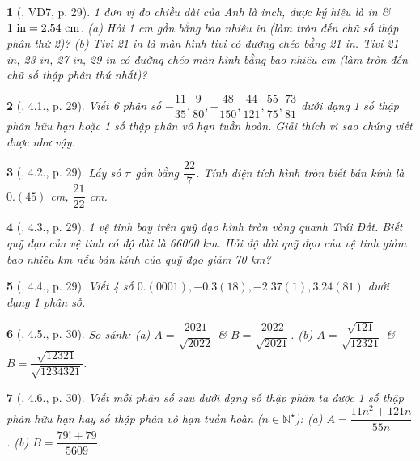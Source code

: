 \documentclass{article}
\newtheorem{baitoan}{}
\begin{document}
\begin{baitoan}[\cite{Binh_boi_duong_Toan_7_tap_1}, VD7, p. 29]
	1 đơn vị đo chiều dài của Anh là inch, được ký hiệu là {\rm in} \& $\rm1\ in = 2.54\ cm$. (a) Hỏi {\rm1 cm} gần bằng bao nhiêu {\rm in} (làm tròn đến chữ số thập phân thứ 2)? (b) Tivi {\rm21 in} là màn hình tivi có đường chéo bằng {\rm21 in}. Tivi {\rm21 in, 23 in, 27 in, 29 in} có đường chéo màn hình bằng bao nhiêu {\rm cm} (làm tròn đến chữ số thập phân thứ nhất)? 
\end{baitoan}

\begin{baitoan}[\cite{Binh_boi_duong_Toan_7_tap_1}, 4.1., p. 29]
	Viết 6 phân số $-\dfrac{11}{35},\dfrac{9}{80},-\dfrac{48}{150},\dfrac{44}{121},\dfrac{55}{75},\dfrac{73}{81}$ dưới dạng 1 số thập phân hữu hạn hoặc 1 số thập phân vô hạn tuần hoàn. Giải thích vì sao chúng viết được như vậy.
\end{baitoan}

\begin{baitoan}[\cite{Binh_boi_duong_Toan_7_tap_1}, 4.2., p. 29]
	Lấy số $\pi$ gần bằng $\dfrac{22}{7}$. Tính diện tích hình tròn biết bán kính là $0.(45)$ {\rm cm}, $\dfrac{21}{22}$ {\rm cm}.
\end{baitoan}

\begin{baitoan}[\cite{Binh_boi_duong_Toan_7_tap_1}, 4.3., p. 29]
	1 vệ tinh bay trên quỹ đạo hình tròn vòng quanh Trái Đất. Biết quỹ đạo của vệ tinh có độ dài là {\rm66000 km}. Hỏi độ dài quỹ đạo của vệ tinh giảm bao nhiêu {\rm km} nếu bán kính của quỹ đạo giảm {\rm70 km}?
\end{baitoan}

\begin{baitoan}[\cite{Binh_boi_duong_Toan_7_tap_1}, 4.4., p. 29]
	Viết 4 số $0.(0001),-0.3(18),-2.37(1),3.24(81)$ dưới dạng 1 phân số.
\end{baitoan}

\begin{baitoan}[\cite{Binh_boi_duong_Toan_7_tap_1}, 4.5., p. 30]
	So sánh: (a) $A = \dfrac{2021}{\sqrt{2022}}$ \& $B = \dfrac{2022}{\sqrt{2021}}$. (b) $A = \dfrac{\sqrt{121}}{\sqrt{12321}}$ \& $B = \dfrac{\sqrt{12321}}{\sqrt{1234321}}$.
\end{baitoan}

\begin{baitoan}[\cite{Binh_boi_duong_Toan_7_tap_1}, 4.6., p. 30]
	Viết mỗi phân số sau dưới dạng số thập phân ta được 1 số thập phân hữu hạn hay số thập phân vô hạn tuần hoàn ($n\in\mathbb{N}^\star$): (a) $A = \dfrac{11n^2 + 121n}{55n}$. (b) $B = \dfrac{79! + 79}{5609}$.
\end{baitoan}
\end{document}
